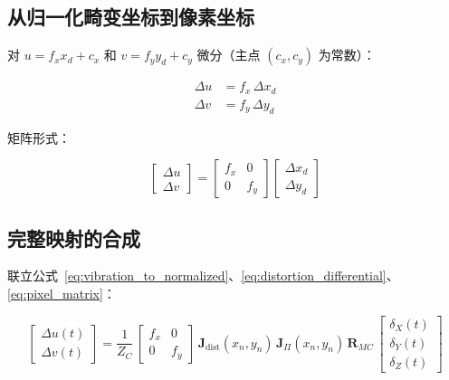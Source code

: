 \documentclass[12pt,a4paper]{article}
\begin{document}
\subsection{从归一化畸变坐标到像素坐标}

对 $u = f_x x_d + c_x$ 和 $v = f_y y_d + c_y$ 微分（主点 $(c_x, c_y)$ 为常数）：

\begin{equation}
\begin{aligned}
\Delta u &= f_x \, \Delta x_d \\
\Delta v &= f_y \, \Delta y_d
\end{aligned}
\label{eq:pixel_differential}
\end{equation}

矩阵形式：

\begin{equation}
\begin{bmatrix} \Delta u \\ \Delta v \end{bmatrix}
=
\begin{bmatrix}
f_x & 0 \\
0   & f_y
\end{bmatrix}
\begin{bmatrix} \Delta x_d \\ \Delta y_d \end{bmatrix}
\label{eq:pixel_matrix}
\end{equation}

\subsection{完整映射的合成}

联立公式~\eqref{eq:vibration_to_normalized}、\eqref{eq:distortion_differential}、\eqref{eq:pixel_matrix}：

\begin{equation}
\boxed{
\begin{bmatrix} \Delta u(t) \\[2pt] \Delta v(t) \end{bmatrix}
=
\frac{1}{Z_C}
\,
\begin{bmatrix}
f_x & 0 \\
0   & f_y
\end{bmatrix}
\,
\mathbf{J}_{\text{dist}}(x_n, y_n)
\,
\mathbf{J}_{\Pi}(x_n, y_n)
\,
\mathbf{R}_{MC}
\,
\begin{bmatrix}
\delta_X(t) \\[2pt] \delta_Y(t) \\[2pt] \delta_Z(t)
\end{bmatrix}
}
\label{eq:complete_mapping}
\end{equation}
\end{document}
